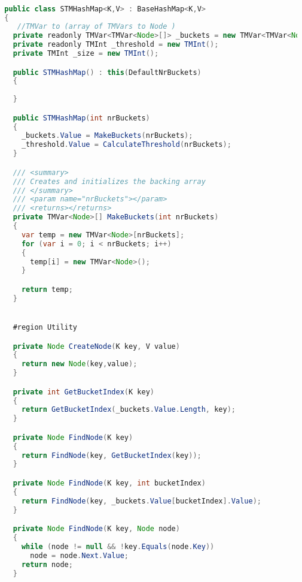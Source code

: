 \begin{lstlisting}[label=lst:impl_hashmap_lib, 
  caption={STM Library Based Concurrent Hashmap Implementation},
  language=Java,  
  showspaces=false,
  showtabs=false,
  breaklines=true,
  showstringspaces=false,
  breakatwhitespace=true,
  commentstyle=\color{greencomments},
  keywordstyle=\color{bluekeywords},
  stringstyle=\color{redstrings},
  escapechar=~,
  morekeywords={atomic, retry, orelse, var, get, set, ref, out, readonly, virtual, override, region, endregion, foreach, lock}]  % Start your code-block

  public class STMHashMap<K,V> : BaseHashMap<K,V>
  {
     //TMVar to (array of TMVars to Node )
    private readonly TMVar<TMVar<Node>[]> _buckets = new TMVar<TMVar<Node>[]>();~\label{line:hashmap_libstm_backingarray}~
    private readonly TMInt _threshold = new TMInt();
    private TMInt _size = new TMInt();

    public STMHashMap() : this(DefaultNrBuckets)
    {
      
    }

    public STMHashMap(int nrBuckets)
    {
      _buckets.Value = MakeBuckets(nrBuckets);
      _threshold.Value = CalculateThreshold(nrBuckets);
    }

    /// <summary>
    /// Creates and initializes the backing array
    /// </summary>
    /// <param name="nrBuckets"></param>
    /// <returns></returns>
    private TMVar<Node>[] MakeBuckets(int nrBuckets)
    {
      var temp = new TMVar<Node>[nrBuckets];
      for (var i = 0; i < nrBuckets; i++)
      {
        temp[i] = new TMVar<Node>(); 
      }

      return temp;
    }


    #region Utility

    private Node CreateNode(K key, V value)
    {
      return new Node(key,value);
    }

    private int GetBucketIndex(K key)
    {
      return GetBucketIndex(_buckets.Value.Length, key);
    }

    private Node FindNode(K key)
    {
      return FindNode(key, GetBucketIndex(key));
    }

    private Node FindNode(K key, int bucketIndex)
    {
      return FindNode(key, _buckets.Value[bucketIndex].Value);
    }

    private Node FindNode(K key, Node node)
    {
      while (node != null && !key.Equals(node.Key))
        node = node.Next.Value;
      return node;
    }


\end{lstlisting}
